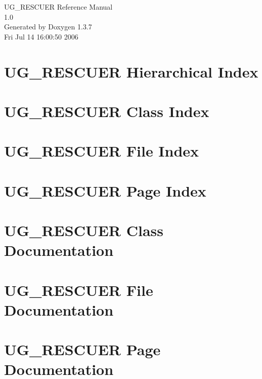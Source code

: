 \documentclass[a4paper]{book}
\begin{document}
\begin{titlepage}
\vspace*{7cm}
\begin{center}
{\Large UG\_\-RESCUER Reference Manual\\[1ex]\large 1.0 }\\
\vspace*{1cm}
{\large Generated by Doxygen 1.3.7}\\
\vspace*{0.5cm}
{\small Fri Jul 14 16:00:50 2006}\\
\end{center}
\end{titlepage}
\clearemptydoublepage
{}
\tableofcontents
\clearemptydoublepage
{}
\chapter{UG\_\-RESCUER Hierarchical Index}

\chapter{UG\_\-RESCUER Class Index}

\chapter{UG\_\-RESCUER File Index}

\chapter{UG\_\-RESCUER Page Index}

\chapter{UG\_\-RESCUER Class Documentation}



\chapter{UG\_\-RESCUER File Documentation}







\chapter{UG\_\-RESCUER Page Documentation}

\printindex
\end{document}
